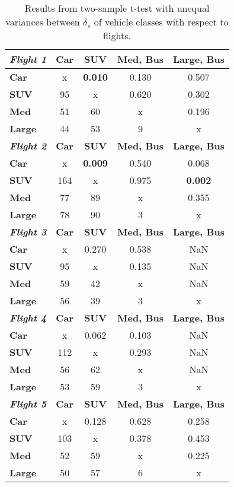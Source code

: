 \begin{table}[H]
\centering
\caption{Results from two-sample t-test with unequal variances between $\delta_{s}$ of vehicle classes with respect to flights.}
\label{tab:t-vehicles}
\begin{tabular}{@{}lcccc@{}}
\toprule
\textit{\textbf{Flight 1}} & \textbf{Car} & \textbf{SUV} & \textbf{Med, Bus} & \textbf{Large, Bus} \\ \midrule
\textbf{Car} & x & \textbf{0.010} & 0.130 & 0.507 \\
\textbf{SUV} & 95 & x & 0.620 & 0.302 \\
\textbf{Med} & 51 & 60 & x & 0.196 \\
\textbf{Large} & 44 & 53 & 9 & x \\ \midrule
\textit{\textbf{Flight 2}} & \textbf{Car} & \textbf{SUV} & \textbf{Med, Bus} & \textbf{Large, Bus} \\
\textbf{Car} & x & \textbf{0.009} & 0.540 & 0.068 \\
\textbf{SUV} & 164 & x & 0.975 & \textbf{0.002} \\
\textbf{Med} & 77 & 89 & x & 0.355 \\
\textbf{Large} & 78 & 90 & 3 & x \\ \midrule
\textit{\textbf{Flight 3}} & \textbf{Car} & \textbf{SUV} & \textbf{Med, Bus} & \textbf{Large, Bus} \\
\textbf{Car} & x & 0.270 & 0.538 & NaN \\
\textbf{SUV} & 95 & x & 0.135 & NaN \\
\textbf{Med} & 59 & 42 & x & NaN \\
\textbf{Large} & 56 & 39 & 3 & x \\  \midrule
\textit{\textbf{Flight 4}} & \textbf{Car} & \textbf{SUV} & \textbf{Med, Bus} & \textbf{Large, Bus} \\
\textbf{Car} & x & 0.062 & 0.103 & NaN \\
\textbf{SUV} & 112 & x & 0.293 & NaN \\
\textbf{Med} & 56 & 62 & x & NaN \\
\textbf{Large} & 53 & 59 & 3 & x \\  \midrule
\textit{\textbf{Flight 5}} & \textbf{Car} & \textbf{SUV} & \textbf{Med, Bus} & \textbf{Large, Bus} \\
\textbf{Car} & x & 0.128 & 0.628 & 0.258 \\
\textbf{SUV} & 103 & x & 0.378 & 0.453 \\
\textbf{Med} & 52 & 59 & x & 0.225 \\
\textbf{Large} & 50 & 57 & 6 & x \\ \bottomrule
\end{tabular}
\end{table}

